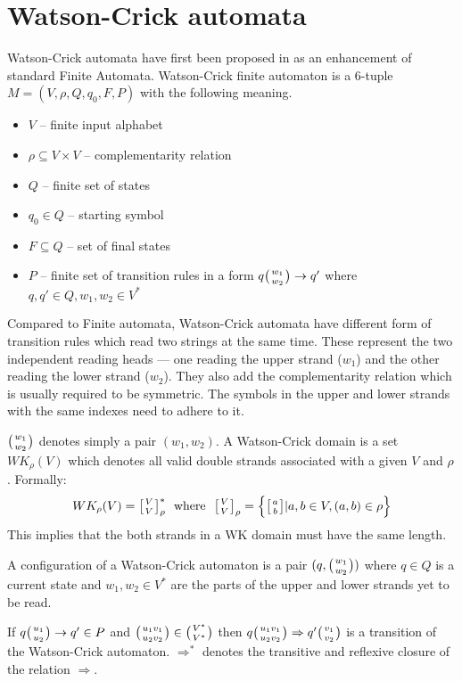 \section{Watson-Crick automata} \label{section:WKA}
Watson-Crick automata have first been proposed in \cite{WK_FIN_AUT} as an enhancement of standard Finite Automata. Watson-Crick finite automaton is a 6-tuple $M = (V, \rho, Q, q_0, F, P)$ with the following meaning.
\begin{itemize}
  \item{$V$ -- finite input alphabet}
  \item{$\rho \subseteq V \times V$ -- complementarity relation}
  \item{$Q$ -- finite set of states}
  \item{$q_0 \in Q$ -- starting symbol}
  \item{$F \subseteq Q$ -- set of final states}
  \item{$P$ -- finite set of transition rules in a form $q \wkpair{w_1}{w_2} \rightarrow q'$ where $q, q' \in Q, w_1, w_2 \in V^*$}
\end{itemize}

Compared to Finite automata, Watson-Crick automata have different form of transition rules which read two strings at the same time. These represent the two independent reading heads --- one reading the upper strand ($w_1$) and the other reading the lower strand ($w_2$). They also add the complementarity relation which is usually required to be symmetric. The symbols in the upper and lower strands with the same indexes need to adhere to it.

$\wkpair{w_1}{w_2}$ denotes simply a pair $(w_1, w_2)$.
A Watson-Crick domain is a set $WK_{\rho}(V)$ which denotes all valid double strands associated with a given $V$ and $\rho$. Formally:
$$WK_{\rho}(V) = \wkdomain{V}{V}_{\rho}^{*} \:\:\: \textnormal{where} \:\:\: \wkdomain{V}{V}_{\rho} = \Big\{\wkdomain{a}{b} | a, b \in V, (a, b) \in \rho \Big\}$$
This implies that the both strands in a WK domain must have the same length.

A configuration of a Watson-Crick automaton is a pair $(q, \wkpair{w_1}{w_2})$ where $q \in Q$ is a current state and $w_1, w_2 \in V^*$ are the parts of the upper and lower strands yet to be read.

If $q\wkpair{u_1}{u_2} \rightarrow q' \in P$ and $\wkpair{u_1 v_1}{u_2 v_2} \in \wkpair{V^*}{V^*}$ then $q \wkpair{u_1 v_1}{u_2 v_2} \Rightarrow q' \wkpair{v_1}{v_2}$ is a transition of the Watson-Crick automaton. $\Rightarrow^*$ denotes the transitive and reflexive closure of the relation $\Rightarrow$.

